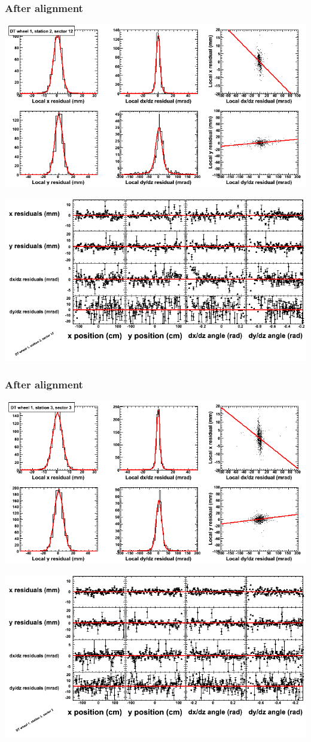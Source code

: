 \documentclass[compress]{beamer}
\begin{document}
\begin{frame}
\frametitle{After alignment}
\includegraphics[width=0.7\linewidth]{NOV4_fitfunctions/MBwhDst2sec12_bellcurves.png}

\includegraphics[width=0.7\linewidth]{NOV4_fitfunctions/MBwhDst2sec12_polynomials.png}
\end{frame}

\begin{frame}
\frametitle{After alignment}
\includegraphics[width=0.7\linewidth]{NOV4_fitfunctions/MBwhDst3sec03_bellcurves.png}

\includegraphics[width=0.7\linewidth]{NOV4_fitfunctions/MBwhDst3sec03_polynomials.png}
\end{frame}
\end{document}
